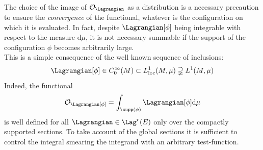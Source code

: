\documentclass[Main]{subfiles}
\begin{document}
		The choice of the image of $\mathcal{O}_\Lagrangian$ as a distribution is a necessary precaution to ensure the \emph{convergence} of the functional, whatever is the configuration on which it is evaluated.
		In fact, despite $\Lagrangian [ \phi ]$  being integrable with respect to the measure $\textrm{d}\mu$, it is not necessary summable if the support of the configuration $\phi$ becomes arbitrarily large.
		\\
		This is a simple consequence of the well known sequence of inclusions:
		\begin{displaymath}
			\Lagrangian [ \phi ] \in C^\infty_0(M) \subset L^1_{\textrm{loc}}(M,\mu) \supsetneqq  L^1(M,\mu) 
		\end{displaymath}
		Indeed, the functional
		\begin{displaymath}
			\mathcal{O}_\Lagrangian [\phi]= \int_{\supp(\phi)} \Lagrangian [\phi] \textrm{d}\mu
		\end{displaymath}
		is well defined for all $\Lagrangian \in \Lag^r(E)$ only over the compactly supported sections. 
		To take account of the global sections it is sufficient to control the integral smearing the integrand with an arbitrary test-function.
	
\end{document}
